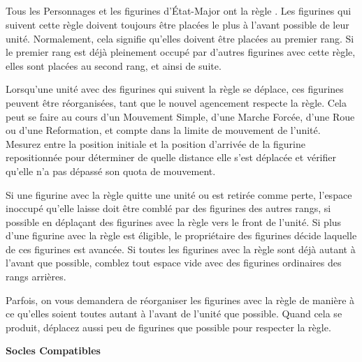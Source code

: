 \newpage
\subsection{\newfromWHB{\frontrank}}
\label{front_rank}

Tous les Personnages et les figurines d'État-Major ont la règle \frontrank{}. Les figurines qui suivent cette règle doivent toujours être placées le plus à l'avant possible de leur unité. Normalement, cela signifie qu'elles doivent être placées au premier rang. Si le premier rang est déjà pleinement occupé par d'autres figurines avec cette règle, elles sont placées au second rang, et ainsi de suite.

Lorsqu'une unité avec des figurines qui suivent la règle \frontrank{} se déplace, ces figurines peuvent être réorganisées, tant que le nouvel agencement respecte la règle. Cela peut se faire au cours d'un Mouvement Simple, d'une Marche Forcée, d'une Roue ou d'une Reformation, et compte dans la limite de mouvement de l'unité. Mesurez entre la position initiale et la position d'arrivée de la figurine repositionnée pour déterminer de quelle distance elle s'est déplacée et vérifier qu'elle n'a pas dépassé son quota de mouvement.

Si une figurine avec la règle \frontrank{} quitte une unité ou est retirée comme perte, l'espace inoccupé qu'elle laisse doit être comblé par des figurines des autres rangs, si possible en déplaçant des figurines avec la règle \frontrank{} vers le front de l'unité. Si plus d'une figurine avec la règle \frontrank{} est éligible, le propriétaire des figurines décide laquelle de ces figurines est avancée. Si toutes les figurines avec la règle \frontrank{} sont déjà autant à l'avant que possible, comblez tout espace vide avec des figurines ordinaires des rangs arrières.

Parfois, on vous demandera de réorganiser les figurines avec la règle \frontrank{} de manière à ce qu'elles soient toutes autant à l'avant de l'unité que possible. Quand cela se produit, déplacez aussi peu de figurines que possible pour respecter la règle.

\noindent\textbf{Socles Compatibles}

